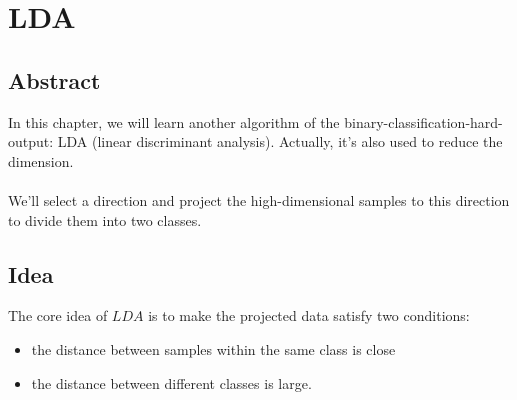 \documentclass{report}
\begin{document}
\section{LDA}
\subsection{Abstract}
In this chapter, we will learn another algorithm of the binary-classification-hard-output: LDA (linear discriminant analysis). Actually, it's also used to reduce the dimension.\\\\
We'll select a direction and project the high-dimensional samples to this direction to divide them into two classes.
\subsection{Idea}
The core idea of $LDA$ is to make the projected data satisfy two conditions:
\begin{itemize}
	\item the distance between samples within the same class is close
	\item the distance between different classes is large.
\end{itemize}
\end{document}
